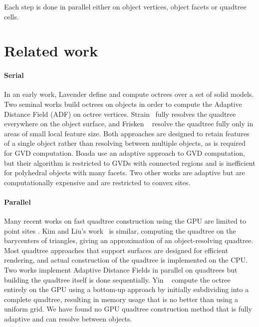 \documentclass[submission]{gmp2017}
\begin{document}
Each step is done in parallel either on object vertices, object facets or quadtree cells.

\section{Related work}

\paragraph{Serial} In an early work, Lavender \etal {} define and compute octrees over a set of solid models. 
Two seminal works build octrees on objects in order to compute the Adaptive Distance Field (ADF) on octree vertices.  Strain~ fully resolves the quadtree everywhere on the object surface, and Frisken \etal~ resolve the quadtree fully only in areas of small local feature size.  Both approaches are designed to retain features of a single object rather than resolving between multiple objects, as is required for GVD computation. Boada \etal {} use an adaptive approach to GVD computation, but their algorithm is restricted to GVDs with connected regions and is inefficient for polyhedral objects with many facets.  Two other works are adaptive \cite{teichmann1997polygonal,vleugels1998approximating} but are computationally expensive and are restricted to convex sites.

\paragraph{Parallel} Many recent works on fast quadtree construction using the GPU are limited to point sites \cite{bedorf2012sparse,karras2012maximizing,zhou2011data}. Kim and Liu's work~ is similar, computing the quadtree on the barycenters of triangles, giving an approximation of an object-resolving quadtree. Most quadtree approaches that support surfaces \cite{baert2013out,crassin2009gigavoxels,laine2011efficient,lefebvre2007compressed} are designed for efficient rendering, and actual construction of the quadtree is implemented on the CPU. Two works \cite{bastos2008gpu,park2010cuda} implement Adaptive Distance Fields in parallel on quadtrees but building the quadtree itself is done sequentially.  Yin \etal~ compute the octree entirely on the GPU using a bottom-up approach by initially subdividing into a complete quadtree, resulting in memory usage that is no better than using a uniform grid. We have found no GPU quadtree construction method that is fully adaptive and can resolve between objects.
\end{document}
